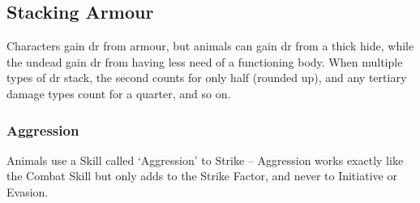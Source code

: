 \begin{multicols}{2}
\subsection{Stacking Armour}

Characters gain \gls{dr} from armour, but animals can gain  \gls{dr} from a thick hide, while the undead gain \gls{dr} from having less need of a functioning body.
When multiple types of \gls{dr} stack, the second counts for only half (rounded up), and any tertiary damage types count for a quarter, and so on.

\subsubsection{Aggression}

Animals use a Skill called `Aggression' to Strike -- Aggression works exactly like the Combat Skill but only adds to the Strike Factor, and never to Initiative or Evasion.

\end{multicols}

\section{}\label{fate_points}

